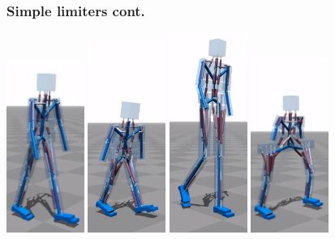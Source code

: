 \documentclass{beamer}
\begin{document}
\begin{frame}
\frametitle{Simple limiters cont.}

\href{run:figs/videos/normal-dude.mp4}{\includegraphics[width=0.19\textwidth]{figs/limiters/1.png}}
\href{run:figs/videos/tiny-dude.mp4}{\includegraphics[width=0.19\textwidth]{figs/limiters/2.png}} 
\href{run:figs/videos/tall-dude.mp4}{\includegraphics[width=0.19\textwidth]{figs/limiters/3.png}} 
\href{run:figs/videos/super-wide-dude.mp4}{\includegraphics[width=0.19\textwidth]{figs/limiters/4.png}} 

\end{frame}
\end{document}
